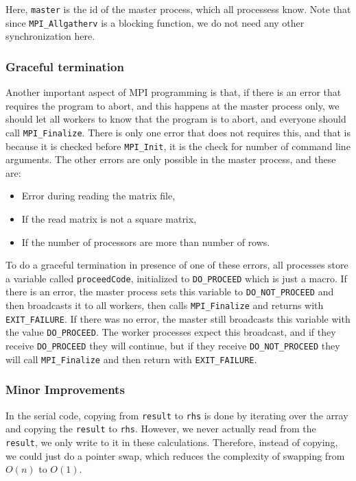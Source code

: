 \documentclass[12pt,reqno]{amsart}
\newcommand{\code}[1]{\texttt{#1}}
\begin{document}
Here, \code{master} is the id of the master process, which all processess know. Note that since \code{MPI\_Allgatherv} is a blocking function, we do not need any other synchronization here.

\subsubsection{Graceful termination}
Another important aspect of MPI programming is that, if there is an error that requires the program to abort, and this happens at the master process only, we should let all workers to know that the program is to abort, and everyone should call \code{MPI\_Finalize}. 
There is only one error that does not requires this, and that is because it is checked before \code{MPI\_Init}, it is the check for number of command line arguments. The other errors are only possible in the master process, and these are:
\begin{itemize}
	\item Error during reading the matrix file,
	\item If the read matrix is not a square matrix,
	\item If the number of processors are more than number of rows.
\end{itemize}
To do a graceful termination in presence of one of these errors, all processes store a variable called \code{proceedCode}, initialized to \code{DO\_PROCEED} which is just a macro. If there is an error, the master process sets this variable to \code{DO\_NOT\_PROCEED} and then broadcasts it to all workers, then calls \code{MPI\_Finalize} and returns with \code{EXIT\_FAILURE}. If there was no error, the master still broadcasts this variable with the value \code{DO\_PROCEED}. The worker processes expect this broadcast, and if they receive \code{DO\_PROCEED} they will continue, but if they receive \code{DO\_NOT\_PROCEED} they will call \code{MPI\_Finalize} and then return with \code{EXIT\_FAILURE}.

\subsubsection{Minor Improvements}
\label{sec:minor}
In the serial code, copying from \code{result} to \code{rhs} is done by iterating over the array and copying the \code{result} to \code{rhs}. However, we never actually read from the \code{result}, we only write to it in these calculations. Therefore, instead of copying, we could just do a pointer swap, which reduces the complexity of swapping from $O(n)$ to $O(1)$.
\end{document}
